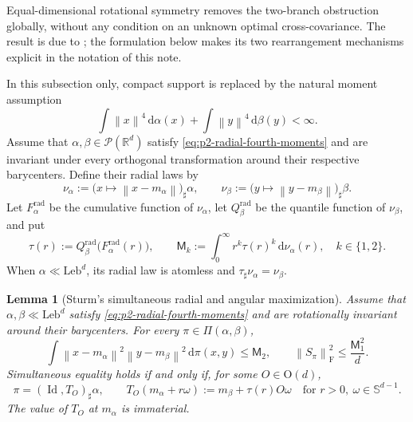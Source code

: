 \documentclass[11pt,a4paper]{article}
\newtheorem{lemma}[theorem]{Lemma}
\theoremstyle{definition}
\theoremstyle{remark}
\newcommand{\R}{\mathbb R}
\newcommand{\Pcal}{\mathcal P}
\newcommand{\Piopt}{\Pi}
\newcommand{\Id}{\operatorname{Id}}
\newcommand{\dd}{\,\mathrm d}
\newcommand{\norm}[1]{\left\lVert #1\right\rVert}
\begin{document}
Equal-dimensional rotational symmetry removes the two-branch obstruction
globally, without any condition on an unknown optimal cross-covariance.  The
result is due to \citet[Theorem~9.21]{Sturm2023Space}; the formulation below
makes its two rearrangement mechanisms explicit in the notation of this note.

In this subsection only, compact support is replaced by the natural moment
assumption
\begin{equation}
  \int\norm{x}^4\dd\alpha(x)+\int\norm{y}^4\dd\beta(y)<\infty.
  \label{eq:p2-radial-fourth-moments}
\end{equation}
Assume that \(\alpha,\beta\in\Pcal(\R^d)\) satisfy
\eqref{eq:p2-radial-fourth-moments} and are invariant under every orthogonal
transformation around their respective barycenters.  Define their radial laws
by
\begin{equation}
  \nu_\alpha
  :=\bigl(x\mapsto\norm{x-m_\alpha}\bigr)_\sharp\alpha,
  \qquad
  \nu_\beta
  :=\bigl(y\mapsto\norm{y-m_\beta}\bigr)_\sharp\beta.
  \label{eq:p2-radial-laws}
\end{equation}
Let \(F_\alpha^{\mathrm{rad}}\) be the cumulative function of
\(\nu_\alpha\), let \(Q_\beta^{\mathrm{rad}}\) be the quantile function of
\(\nu_\beta\), and put
\begin{equation}
  \tau(r):=
  Q_\beta^{\mathrm{rad}}\bigl(F_\alpha^{\mathrm{rad}}(r)\bigr),
  \qquad
  \mathsf M_k:=\int_0^\infty r^k\tau(r)^k\dd\nu_\alpha(r),
  \quad k\in\{1,2\}.
  \label{eq:p2-radial-rearrangement}
\end{equation}
When \(\alpha\ll\mathrm{Leb}^d\), its radial law is atomless and
\(\tau_\sharp\nu_\alpha=\nu_\beta\).

\begin{lemma}[Sturm's simultaneous radial and angular maximization]
\label{lem:sturm-polar-maximization}
Assume that \(\alpha,\beta\ll\mathrm{Leb}^d\) satisfy
\eqref{eq:p2-radial-fourth-moments} and are rotationally invariant around
their barycenters.  For every \(\pi\in\Piopt(\alpha,\beta)\),
\begin{equation}
  \int\norm{x-m_\alpha}^2\norm{y-m_\beta}^2\dd\pi(x,y)
  \leq\mathsf M_2,
  \qquad
  \norm{S_\pi}_{\mathrm F}^2\leq\frac{\mathsf M_1^2}{d}.
  \label{eq:p2-sturm-two-bounds}
\end{equation}
Simultaneous equality holds if and only if, for some \(O\in\mathrm O(d)\),
\begin{equation}
  \pi=(\Id,T_O)_\sharp\alpha,
  \qquad
  T_O(m_\alpha+r\omega)
  :=m_\beta+\tau(r)O\omega
  \quad
  \text{for }r>0,\ \omega\in\mathbb S^{d-1}.
  \label{eq:p2-sturm-radial-map}
\end{equation}
The value of \(T_O\) at \(m_\alpha\) is immaterial.
\end{lemma}
\end{document}
